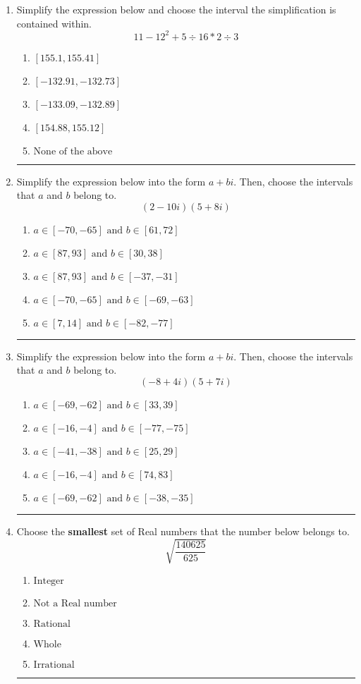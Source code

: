 \documentclass[14pt]{extbook}
\newcommand{\litem}[1]{\item#1\hspace*{-1cm}\rule{\textwidth}{0.4pt}}
\begin{document}
\begin{enumerate}
{\begin{enumerate}[label=\Alph*.]
\end{enumerate} }
\litem{
Simplify the expression below and choose the interval the simplification is contained within.\[ 11 - 12^2 + 5 \div 16 * 2 \div 3 \]\begin{enumerate}[label=\Alph*.]
\item \( [155.1, 155.41] \)
\item \( [-132.91, -132.73] \)
\item \( [-133.09, -132.89] \)
\item \( [154.88, 155.12] \)
\item \( \text{None of the above} \)

\end{enumerate} }
\litem{
Simplify the expression below into the form $a+bi$. Then, choose the intervals that $a$ and $b$ belong to.\[ (2 - 10 i)(5 + 8 i) \]\begin{enumerate}[label=\Alph*.]
\item \( a \in [-70, -65] \text{ and } b \in [61, 72] \)
\item \( a \in [87, 93] \text{ and } b \in [30, 38] \)
\item \( a \in [87, 93] \text{ and } b \in [-37, -31] \)
\item \( a \in [-70, -65] \text{ and } b \in [-69, -63] \)
\item \( a \in [7, 14] \text{ and } b \in [-82, -77] \)

\end{enumerate} }
\litem{
Simplify the expression below into the form $a+bi$. Then, choose the intervals that $a$ and $b$ belong to.\[ (-8 + 4 i)(5 + 7 i) \]\begin{enumerate}[label=\Alph*.]
\item \( a \in [-69, -62] \text{ and } b \in [33, 39] \)
\item \( a \in [-16, -4] \text{ and } b \in [-77, -75] \)
\item \( a \in [-41, -38] \text{ and } b \in [25, 29] \)
\item \( a \in [-16, -4] \text{ and } b \in [74, 83] \)
\item \( a \in [-69, -62] \text{ and } b \in [-38, -35] \)

\end{enumerate} }
\litem{
Choose the \textbf{smallest} set of Real numbers that the number below belongs to.\[ \sqrt{\frac{140625}{625}} \]\begin{enumerate}[label=\Alph*.]
\item \( \text{Integer} \)
\item \( \text{Not a Real number} \)
\item \( \text{Rational} \)
\item \( \text{Whole} \)
\item \( \text{Irrational} \)


\end{enumerate}}
\end{enumerate}
\end{document}
